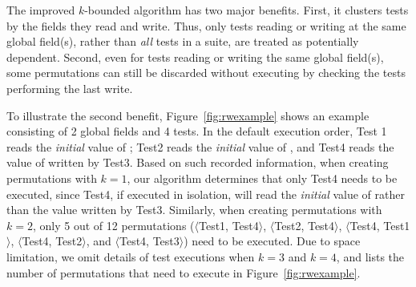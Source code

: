 The improved $k$-bounded algorithm has two major benefits.
First, it clusters tests by the fields they
read and write. Thus, only tests reading or writing at
the same global field(s), rather than \textit{all} tests
in a suite, are treated as potentially dependent.
Second, even for tests reading or writing the same global
field(s), some permutations can still be discarded
without executing by checking the tests performing the last write.


To illustrate the second benefit, Figure~\ref{fig:rwexample}
shows an example
consisting of 2 global fields and 4 tests. In the default execution
order, Test 1 reads the \textit{initial} value of ;
Test2 reads the \textit{initial} value of , and Test4
reads the value of  written by Test3.
Based on such recorded information, when creating permutations with $k=1$,
our algorithm determines that only
Test4 needs to be executed, since Test4, if executed in isolation,
will read the \textit{initial} value of  rather than the 
value written by Test3. Similarly, when creating permutations with $k=2$,
only 5 out of 12 permutations ($\langle$Test1, Test4$\rangle$,
$\langle$Test2, Test4$\rangle$, $\langle$Test4, Test1$\rangle$,
$\langle$Test4, Test2$\rangle$, and $\langle$Test4, Test3$\rangle$) need to be executed.
Due to space limitation, we omit details of test executions when
$k=3$ and $k=4$, and lists the number of permutations that need
to execute in Figure~\ref{fig:rwexample}.









